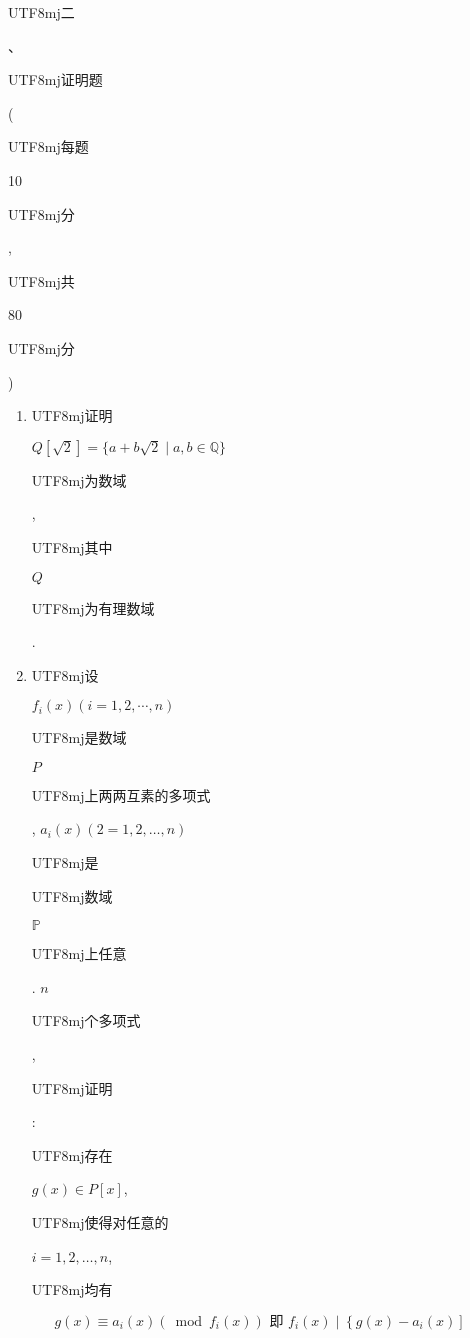 \documentclass[10pt]{article}
\begin{document}
\begin{CJK}{UTF8}{mj}二\end{CJK}、 \begin{CJK}{UTF8}{mj}证明题\end{CJK} (\begin{CJK}{UTF8}{mj}每题\end{CJK} 10 \begin{CJK}{UTF8}{mj}分\end{CJK}, \begin{CJK}{UTF8}{mj}共\end{CJK} 80 \begin{CJK}{UTF8}{mj}分\end{CJK})

\begin{enumerate}
  \item \begin{CJK}{UTF8}{mj}证明\end{CJK} $Q[\sqrt{2}]=\{a+b \sqrt{2} \mid a, b \in \mathbb{Q}\}$ \begin{CJK}{UTF8}{mj}为数域\end{CJK}, \begin{CJK}{UTF8}{mj}其中\end{CJK} $Q$ \begin{CJK}{UTF8}{mj}为有理数域\end{CJK}.

  \item \begin{CJK}{UTF8}{mj}设\end{CJK} $f_{i}(x)(i=1,2, \cdots, n)$ \begin{CJK}{UTF8}{mj}是数域\end{CJK} $P$ \begin{CJK}{UTF8}{mj}上两两互素的多项式\end{CJK}, $a_{i}(x)(2=1,2, \ldots, n)$ \begin{CJK}{UTF8}{mj}是\end{CJK} \begin{CJK}{UTF8}{mj}数域\end{CJK} $\mathbb{P}$ \begin{CJK}{UTF8}{mj}上任意\end{CJK}. $n$ \begin{CJK}{UTF8}{mj}个多项式\end{CJK}, \begin{CJK}{UTF8}{mj}证明\end{CJK}: \begin{CJK}{UTF8}{mj}存在\end{CJK} $g(x) \in P[x]$, \begin{CJK}{UTF8}{mj}使得对任意的\end{CJK} $i=1,2, \ldots, n$, \begin{CJK}{UTF8}{mj}均有\end{CJK}

\end{enumerate}
$$
g(x) \equiv a_{i}(x)\left(\bmod f_{i}(x)\right) \text { 即 } f_{i}(x) \mid\left\{g(x)-a_{i}(x)\right]
$$
\end{document}
